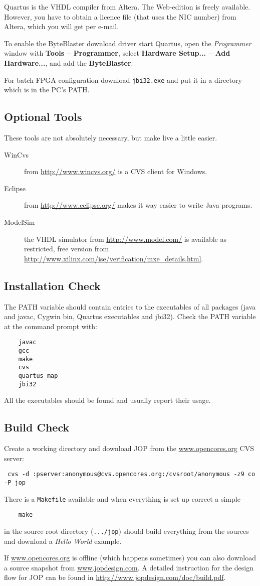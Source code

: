 \documentclass[a4paper,12pt]{scrartcl}
\newcommand{\code}[1]{{\texttt{#1}}}
\newcommand{\cmd}[1]{{\texttt{#1}}}
\newcommand{\dirent}[1]{{\texttt{#1}}}
\newcommand{\menuitem}[1]{\textsf{\textbf{#1}}}
\begin{document}
Quartus is the VHDL compiler from Altera. The Web-edition is freely
available. However, you have to obtain a licence file (that uses the
NIC number) from Altera, which you will get per e-mail.

To enable the ByteBlaster download driver start Quartus, open the
\emph{Programmer} window with \menuitem{Tools -- Programmer}, select
\menuitem{Hardware Setup... -- Add Hardware...}, and add the
\menuitem{ByteBlaster}.

For batch FPGA configuration download \cmd{jbi32.exe} and put it in
a directory which is in the PC's PATH.

\subsection*{Optional Tools}

These tools are not absolutely necessary, but make live a little
easier.

\begin{description}
    \item[WinCvs] from \url{http://www.wincvs.org/} is a CVS client
    for Windows.
    \item[Eclipse] from \url{http://www.eclipse.org/} makes it way
    easier to write Java programs.
    \item[ModelSim] the VHDL simulator from \url{http://www.model.com/}
    is available as restricted, free version from
    \url{http://www.xilinx.com/ise/verification/mxe_details.html}.
\end{description}

\subsection*{Installation Check}

The PATH variable should contain entries to the executables of all
packages (java and javac, Cygwin bin, Quartus executables and
jbi32). Check the PATH variable at the command prompt with:
%
\begin{verbatim}
    javac
    gcc
    make
    cvs
    quartus_map
    jbi32
\end{verbatim}
%
All the executables should be found and usually report their usage.

\subsection*{Build Check}

Create a working directory and download JOP from the
\url{www.opencores.org} CVS server:
%
\begin{verbatim}
 cvs -d :pserver:anonymous@cvs.opencores.org:/cvsroot/anonymous -z9 co -P jop
\end{verbatim}
%
There is a \code{Makefile} available and when everything is set up
correct a simple
%
\begin{verbatim}
    make
\end{verbatim}
%
in the source root directory (\dirent{.../jop}) should build
everything from the sources and download a \emph{Hello World}
example.

If \url{www.opencores.org} is offline (which happens sometimes) you
can also download a source snapshot from \url{www.jopdesign.com}. A
detailed instruction for the design flow for JOP can be found in
\url{http://www.jopdesign.com/doc/build.pdf}.
\end{document}
